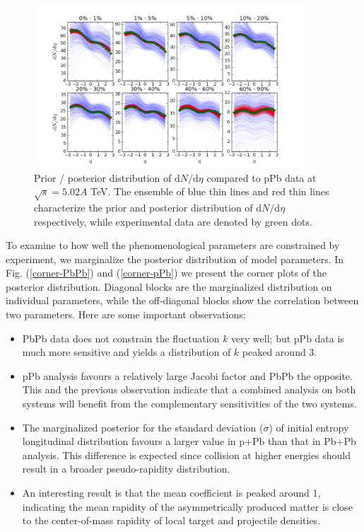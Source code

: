\documentclass[aps,prl,twocolumn,groupedaddress]{revtex4-1}
\begin{document}
	\begin{figure}
	\begin{center}
	\includegraphics[width=0.9\textwidth]{pics/pri-post-pPb.png}
	\caption{Prior / posterior distribution of $\mathrm{d}N/\mathrm{d}\eta$ compared to pPb data at $\sqrt{s} = 5.02 A$ TeV. The ensemble of blue thin lines and red thin lines characterize the prior and posterior distribution of $\mathrm{d}N/\mathrm{d}\eta$ respectively, while experimental data are denoted by green dots.}\label{pri-post-pPb}
	\end{center}
	\end{figure}
	 
	To examine to how well the phenomenological parameters are constrained by experiment, we marginalize the posterior distribution of model parameters. 
	In Fig. (\ref{corner-PbPb}) and (\ref{corner-pPb}) we present the corner plots of the posterior distribution. 
	Diagonal blocks are the marginalized distribution on individual parameters, while the off-diagonal blocks show the correlation between two parameters. 
	Here are some important observations:
	\begin{itemize}
	\item PbPb data does not constrain the fluctuation $k$ very well; but pPb data is much more sensitive and yields a distribution of $k$ peaked around 3.
	\item pPb analysis favours a relatively large Jacobi factor and PbPb the opposite. 
	This and the previous observation indicate that a combined analysis on both systems will benefit from the complementary sensitivities of the two systems.
	\item The marginalized posterior for the standard deviation ($\sigma$) of initial entropy longitudinal distribution favours a larger value in p+Pb than that in Pb+Pb analysis. 
	This difference is expected since collision at higher energies should result in a broader pseudo-rapidity distribution. 
	\item  An interesting result is that the mean coefficient is peaked around 1, indicating the mean rapidity of the asymmetrically produced matter is close to the center-of-mass rapidity of local target and projectile densities.
	\end{itemize}
	
\end{document}
